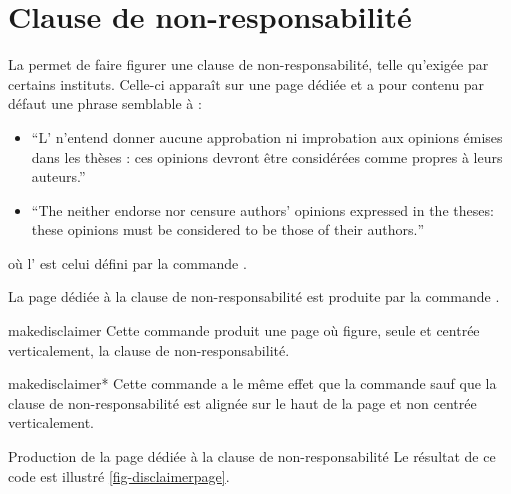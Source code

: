\section{Clause de non-responsabilité}
\label{sec-clause-de-non}%
%

%
%
La \yatCl{} permet de faire figurer une clause de non-responsabilité, telle
qu'exigée par certains instituts. Celle-ci apparaît sur une page dédiée et
a pour contenu par défaut une phrase semblable à\selonlangue{} :
  \begin{itemize}
  \item \enquote{L' n'entend donner aucune
      approbation ni improbation aux opinions \'emises dans les th\`eses : ces
      opinions devront \^etre consid\'er\'ees comme propres \`a leurs auteurs.}
  \item \foreignquote{english}{The  neither endorse
      nor censure authors' opinions expressed in the theses: these opinions
      must be considered to be those of their authors.}
  \end{itemize}
  où l' est celui défini par la commande 
  .

La page dédiée à la clause de non-responsabilité est produite par la commande
.

\begin{docCommand}{makedisclaimer}{}
  Cette commande produit une page où figure, seule et centrée
  verticalement, la clause de non-responsabilité.
\end{docCommand}

\begin{docCommand}{makedisclaimer*}{}
  Cette commande a le même effet que la commande
   sauf que la clause de non-responsabilité est alignée
  sur le haut de la page et non centrée verticalement.
\end{docCommand}

\begin{dbexample}{Production de la page dédiée à la clause de
    non-responsabilité}{}
  \NoAutoSpacing%
%
%
  Le résultat de ce code est illustré \vref{fig-disclaimerpage}.
\end{dbexample}

